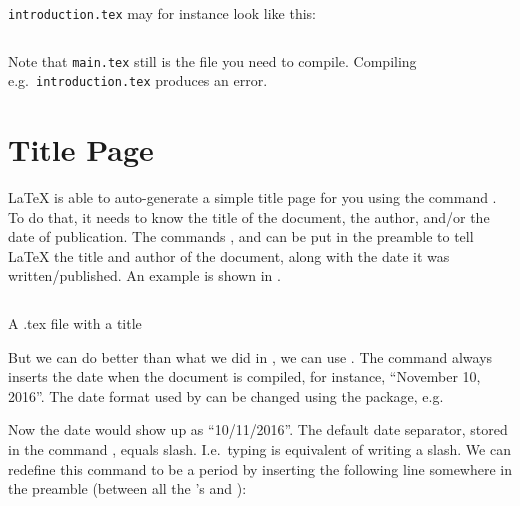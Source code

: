 {\verb|introduction.tex| may for instance look like this:
	\inputminted[frame=lines,linenos]{latex}{latex/introduction.tex}
Note that \verb|main.tex| still is the file you need to compile. Compiling e.g.\ \verb|introduction.tex| produces an error.

\section{Title Page}\label{sec:latex:title}
\index{\latexin{\maketitle}}
\index{\latexin{\title}}
\index{\latexin{\author}}
\index{\latexin{\date}}
\LaTeX{} is able to auto-generate a simple title page for you using the command \latexin{\maketitle}. To do that, it needs to know the title of the document, the author, and/or the date of publication. The commands \latexin{\title}, \latexin{\author} and \latexin{\date} can be put in the preamble to tell \LaTeX{} the title and author of the document, along with the date it was written/published. An example is shown in .

\begin{listing}
	\inputminted[frame=lines,linenos]{latex}{latex/title.tex}
	\caption{A .tex file with a title}
	\label{lst:latex:title}
\end{listing}

\index{\latexin{\today}}
But we can do better than what we did in , we can use \latexin{\date{\today}}. The command \latexin{\today} always inserts the date when the document is compiled, for instance, ``November 10, 2016''. The date format used by \latexin{\today} can be changed using the  package, e.g.\

\latexone{\usepackage[ddmmyyyy]{datetime}}
\noindent Now the date would show up as ``10/11/2016''. The default date separator, stored in the command \latexin{\dateseparator}, equals slash. I.e.\ typing \latexin{\dateseparator} is equivalent of writing a slash. We can redefine this command to be a period by inserting the following line somewhere in the preamble (between all the \latexin{\usepackage}'s and \latexin{}):

}
